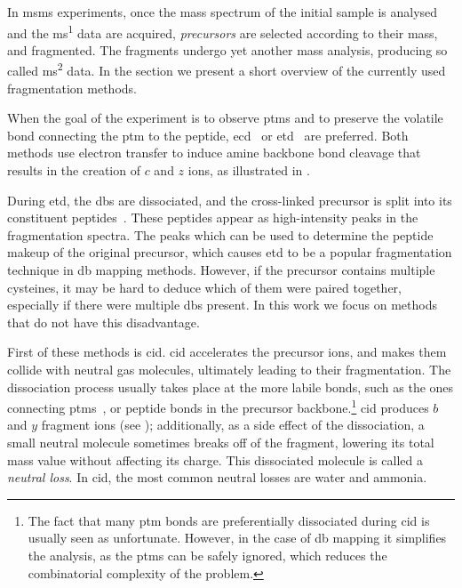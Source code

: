 In \gls*{msms} experiments, once the mass spectrum of the initial sample is analysed and the \gls*{ms}\textsuperscript{1} data are acquired, \emph{precursors} are selected according to their mass, and fragmented. The fragments undergo yet another mass analysis, producing so called \gls*{ms}\textsuperscript{2} data. In the section we present a short overview of the currently used fragmentation methods.

When the goal of the experiment is to observe \glspl*{ptm} and to preserve the volatile bond connecting the \gls*{ptm} to the peptide, \gls*{ecd}~\cite{zubarev2000electron} or \gls*{etd}~\cite{syka2004peptide} are preferred. Both methods use electron transfer to induce amine backbone bond cleavage that results in the creation of \(c\) and \(z\) ions, as illustrated in .

During \gls*{etd}, the \glspl*{db} are dissociated, and the cross-linked precursor is split into its constituent peptides~\cite{liu2014facilitating}. These peptides appear as high-intensity peaks in the fragmentation spectra. The peaks which can be used to determine the peptide makeup of the original precursor, which causes \gls*{etd} to be a popular fragmentation technique in \gls*{db} mapping methods. However, if the precursor contains multiple cysteines, it may be hard to deduce which of them were paired together, especially if there were multiple \glspl*{db} present. In this work we focus on methods that do not have this disadvantage.

First of these methods is \gls*{cid}. \gls*{cid} accelerates the precursor ions, and makes them collide with neutral gas molecules, ultimately leading to their fragmentation. The dissociation process usually takes place at the more labile bonds, such as the ones connecting \glspl*{ptm}~\cite{quan2013cid}, or peptide bonds in the precursor backbone.\footnote{The fact that many \gls*{ptm} bonds are preferentially dissociated during \gls*{cid} is usually seen as unfortunate. However, in the case of \gls*{db} mapping it simplifies the analysis, as the \glspl*{ptm} can be safely ignored, which reduces the combinatorial complexity of the problem.} \gls*{cid} produces \(b\) and \(y\) fragment ions (see ); additionally, as a side effect of the dissociation, a small neutral molecule sometimes breaks off of the fragment, lowering its total mass value without affecting its charge. This dissociated molecule is called a \emph{neutral loss}. In \gls*{cid}, the most common neutral losses are water and ammonia.


